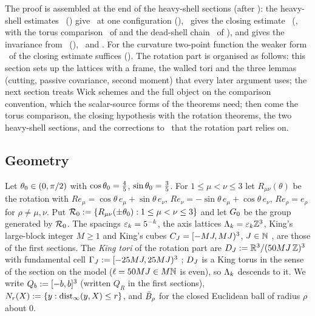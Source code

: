 The proof is assembled at the end of the heavy-shell sections (after ): the heavy-shell estimates \HS\ () give \REz\ at one configuration (), \REz\ gives the closing estimate \TIz\ (, with the torus comparison \Kz\ of  and the dead-shell chain \DSh\ of ), and  gives the invariance from \EC\ (), \Kz\ and \TIz. For the curvature two-point function the weaker form \TItwo\ of the closing estimate suffices (). The rotation part is organised as follows: this section sets up the lattices with a frame, the walled tori and the three lemmas (cutting, passive covariance, second moment) that every later argument uses; the next section treats Wick schemes and the full object on the comparison convention, which the scalar-source forms of the theorems need; then come the torus comparison, the closing hypothesis with the rotation theorems, the two heavy-shell sections, and the corrections to~\cite{K1,K2} that the rotation part relies on.

\subsection{Geometry}

\begin{definition}\label{rot:def:geom}
Let $\theta_0\in(0,\pi/2)$ with $\cos\theta_0=\frac45$, $\sin\theta_0=\frac35$. For $1\le\mu<\nu\le3$ let $R_{\mu\nu}(\theta)$ be the rotation with $Re_\mu=\cos\theta\,e_\mu+\sin\theta\,e_\nu$, $Re_\nu=-\sin\theta\,e_\mu+\cos\theta\,e_\nu$, $Re_\rho=e_\rho$ for $\rho\ne\mu,\nu$. Put $\mathcal R_0:=\{R_{\mu\nu}(\pm\theta_0):1\le\mu<\nu\le3\}$ and let $G_0$ be the group generated by $\mathcal R_0$. The spacings $\varepsilon_k=5^{-k}$, the axis lattices $\Lambda_k=\varepsilon_k\mathbb Z^3$, King's large-block integer $M\ge1$ \cite[\S2.3]{K1} and King's cubes $C_J=[-MJ,MJ)^3$, $J\in\mathbb N$ \cite[(2.7)]{K2}, are those of the first sections. The \emph{King tori} of the rotation part are $D_J:=\mathbb R^3/(50MJ\,\mathbb Z)^3$ with fundamental cell $\Gamma_J:=[-25MJ,25MJ)^3$ \cite[(4.1)]{K2}; $D_J$ is a King torus in the sense of the section on the model ($\ell=50MJ\in M\mathbb N$ is even), so $\Lambda_k$ descends to it. We write $Q_{b}:=[-b,b]^3$ (written $Q_R$ in the first sections), $N_{r}(X):=\{y:\operatorname{dist}_\infty(y,X)\le r\}$, and $\bar B_{\rho}$ for the closed Euclidean ball of radius $\rho$ about $0$.
\end{definition}

